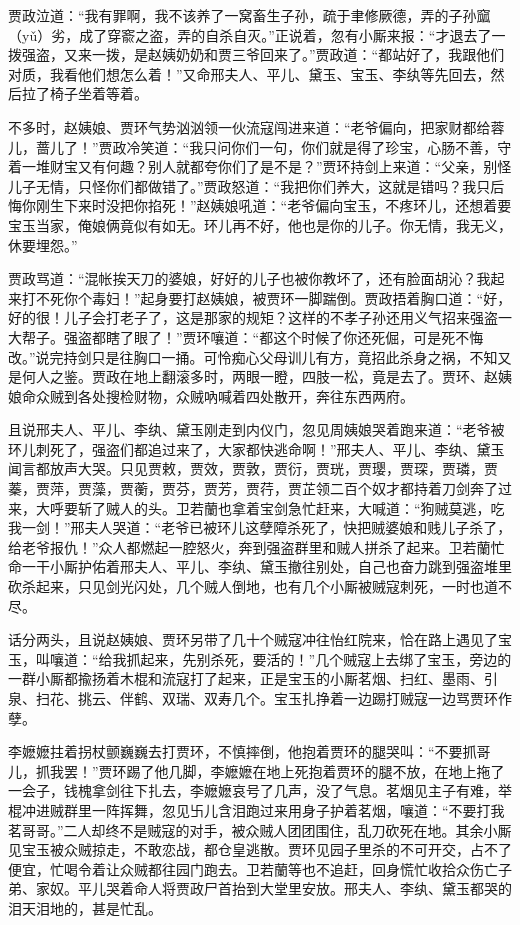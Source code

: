 \documentclass[12pt,oneside]{book}
\begin{document}
贾政泣道：“我有罪啊，我不该养了一窝畜生子孙，疏于聿修厥德，弄的子孙窳（yǔ）劣，成了穿窬之盗，弄的自杀自灭。”正说着，忽有小厮来报：“才退去了一拨强盗，又来一拨，是赵姨奶奶和贾三爷回来了。”贾政道：“都站好了，我跟他们对质，我看他们想怎么着！”又命邢夫人、平儿、黛玉、宝玉、李纨等先回去，然后拉了椅子坐着等着。

不多时，赵姨娘、贾环气势汹汹领一伙流寇闯进来道：“老爷偏向，把家财都给蓉儿，蔷儿了！”贾政冷笑道：“我只问你们一句，你们就是得了珍宝，心肠不善，守着一堆财宝又有何趣？别人就都夸你们了是不是？”贾环持剑上来道：“父亲，别怪儿子无情，只怪你们都做错了。”贾政怒道：“我把你们养大，这就是错吗？我只后悔你刚生下来时没把你掐死！”赵姨娘吼道：“老爷偏向宝玉，不疼环儿，还想着要宝玉当家，俺娘俩竟似有如无。环儿再不好，他也是你的儿子。你无情，我无义，休要埋怨。”

贾政骂道：“混帐挨天刀的婆娘，好好的儿子也被你教坏了，还有脸面胡沁？我起来打不死你个毒妇！”起身要打赵姨娘，被贾环一脚踹倒。贾政捂着胸口道：“好，好的很！儿子会打老子了，这是那家的规矩？这样的不孝子孙还用义气招来强盗一大帮子。强盗都瞎了眼了！”贾环嚷道：“都这个时候了你还死倔，可是死不悔改。”说完持剑只是往胸口一捅。可怜痴心父母训儿有方，竟招此杀身之祸，不知又是何人之鉴。贾政在地上翻滚多时，两眼一瞪，四肢一松，竟是去了。贾环、赵姨娘命众贼到各处搜检财物，众贼吶喊着四处散开，奔往东西两府。

且说邢夫人、平儿、李纨、黛玉刚走到内仪门，忽见周姨娘哭着跑来道：“老爷被环儿刺死了，强盗们都追过来了，大家都快逃命啊！”邢夫人、平儿、李纨、黛玉闻言都放声大哭。只见贾敕，贾效，贾敦，贾衍，贾珖，贾璎，贾琛，贾璘，贾蓁，贾萍，贾藻，贾蘅，贾芬，贾芳，贾荇，贾芷领二百个奴才都持着刀剑奔了过来，大呼要斩了贼人的头。卫若蘭也拿着宝剑急忙赶来，大喊道：“狗贼莫逃，吃我一剑！”邢夫人哭道：“老爷已被环儿这孽障杀死了，快把贼婆娘和贱儿子杀了，给老爷报仇！”众人都燃起一腔怒火，奔到强盗群里和贼人拼杀了起来。卫若蘭忙命一干小厮护佑着邢夫人、平儿、李纨、黛玉撤往别处，自己也奋力跳到强盗堆里砍杀起来，只见剑光闪处，几个贼人倒地，也有几个小厮被贼寇刺死，一时也道不尽。

话分两头，且说赵姨娘、贾环另带了几十个贼寇冲往怡红院来，恰在路上遇见了宝玉，叫嚷道：“给我抓起来，先别杀死，要活的！”几个贼寇上去绑了宝玉，旁边的一群小厮都揄扬着木棍和流寇打了起来，正是宝玉的小厮茗烟、扫红、墨雨、引泉、扫花、挑云、伴鹤、双瑞、双寿几个。宝玉扎挣着一边踢打贼寇一边骂贾环作孽。

李嬷嬷拄着拐杖颤巍巍去打贾环，不慎摔倒，他抱着贾环的腿哭叫：“不要抓哥儿，抓我罢！”贾环踢了他几脚，李嬷嬷在地上死抱着贾环的腿不放，在地上拖了一会子，钱槐拿剑往下扎去，李嬷嬷哀号了几声，没了气息。茗烟见主子有难，举棍冲进贼群里一阵挥舞，忽见卐儿含泪跑过来用身子护着茗烟，嚷道：“不要打我茗哥哥。”二人却终不是贼寇的对手，被众贼人团团围住，乱刀砍死在地。其余小厮见宝玉被众贼掠走，不敢恋战，都仓皇逃散。贾环见园子里杀的不可开交，占不了便宜，忙喝令着让众贼都往园门跑去。卫若蘭等也不追赶，回身慌忙收拾众伤亡子弟、家奴。平儿哭着命人将贾政尸首抬到大堂里安放。邢夫人、李纨、黛玉都哭的泪天泪地的，甚是忙乱。
\end{document}
